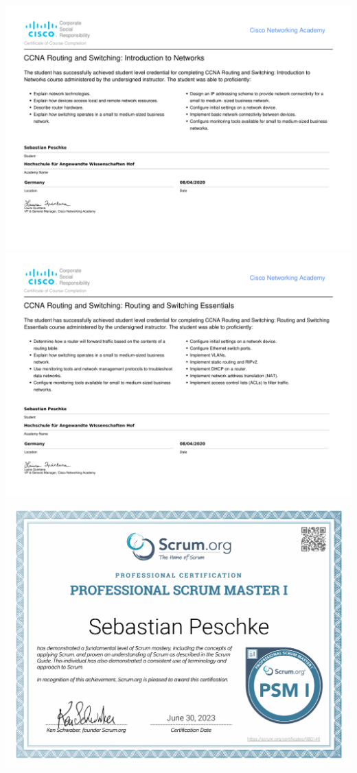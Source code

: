\documentclass[
	10pt, %
]{FreemanCV}
\begin{document}
\begin{landscape}
	\includegraphics[scale=0.8]{./assets/SebastianPeschke-HOF_2020_I2N_HEY-certificate}
	\newpage
	\includegraphics[scale=0.8]{./assets/SebastianPeschke-HOF_2020_RSE_HEY-certificate}
	\newpage
	\includegraphics[scale=0.8]{./assets/Professional Scrum Master I}
\end{landscape}
\end{document}
